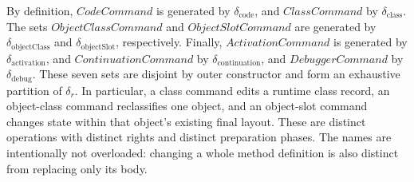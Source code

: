 By definition, $\mathit{CodeCommand}$ is generated by
$\delta_{\mathrm{code}}$, and $\mathit{ClassCommand}$ by
$\delta_{\mathrm{class}}$.  The sets $\mathit{ObjectClassCommand}$ and
$\mathit{ObjectSlotCommand}$ are generated by
$\delta_{\mathrm{objectClass}}$ and $\delta_{\mathrm{objectSlot}}$,
respectively.  Finally, $\mathit{ActivationCommand}$ is generated by
$\delta_{\mathrm{activation}}$, and $\mathit{ContinuationCommand}$ by
$\delta_{\mathrm{continuation}}$, and $\mathit{DebuggerCommand}$ by
$\delta_{\mathrm{debug}}$.  These seven sets are disjoint by outer
constructor and form an exhaustive partition of $\delta_r$.  In particular,
a class command edits a runtime class record, an
object-class command reclassifies one object, and an object-slot command
changes state within that object's existing final layout.  These are distinct
operations with distinct rights and distinct preparation phases.  The names
are intentionally not overloaded: changing a whole method definition is also
distinct from replacing only its body.

